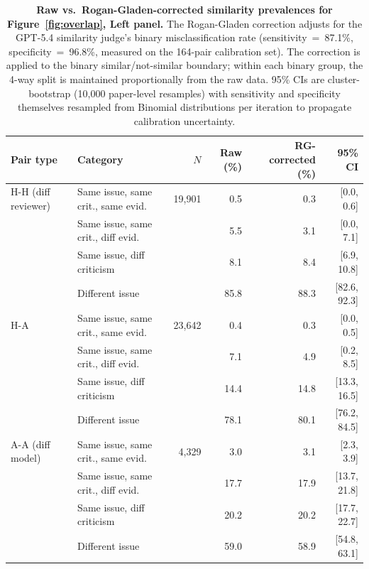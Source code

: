 \begin{table}[t]
\centering
\fontsize{7.5}{10}\selectfont
\setlength{\tabcolsep}{3pt}
\begin{tabular}{l l r r r r}
\toprule
\textbf{Pair type} & \textbf{Category} & $N$ & \textbf{Raw (\%)} & \textbf{RG-corrected (\%)} & \textbf{95\% CI} \\
\midrule
H-H (diff reviewer) & Same issue, same crit., same evid. & 19{,}901 & 0.5 & 0.3 & [0.0, 0.6] \\
 & Same issue, same crit., diff evid. &  & 5.5 & 3.1 & [0.0, 7.1] \\
 & Same issue, diff criticism &  & 8.1 & 8.4 & [6.9, 10.8] \\
 & Different issue &  & 85.8 & 88.3 & [82.6, 92.3] \\
\midrule
H-A & Same issue, same crit., same evid. & 23{,}642 & 0.4 & 0.3 & [0.0, 0.5] \\
 & Same issue, same crit., diff evid. &  & 7.1 & 4.9 & [0.2, 8.5] \\
 & Same issue, diff criticism &  & 14.4 & 14.8 & [13.3, 16.5] \\
 & Different issue &  & 78.1 & 80.1 & [76.2, 84.5] \\
\midrule
A-A (diff model) & Same issue, same crit., same evid. & 4{,}329 & 3.0 & 3.1 & [2.3, 3.9] \\
 & Same issue, same crit., diff evid. &  & 17.7 & 17.9 & [13.7, 21.8] \\
 & Same issue, diff criticism &  & 20.2 & 20.2 & [17.7, 22.7] \\
 & Different issue &  & 59.0 & 58.9 & [54.8, 63.1] \\
\bottomrule
\end{tabular}
\caption{\textbf{Raw vs.\ Rogan-Gladen-corrected similarity prevalences for Figure~\ref{fig:overlap}, Left panel.}
The Rogan-Gladen correction adjusts for the GPT-5.4 similarity judge's binary misclassification rate (sensitivity~=~87.1\%, specificity~=~96.8\%, measured on the 164-pair calibration set).
The correction is applied to the binary similar/not-similar boundary; within each binary group, the 4-way split is maintained proportionally from the raw data.
95\% CIs are cluster-bootstrap (10{,}000 paper-level resamples) with sensitivity and specificity themselves resampled from Binomial distributions per iteration to propagate calibration uncertainty.}
\label{tab:rg-comparison}
\end{table}